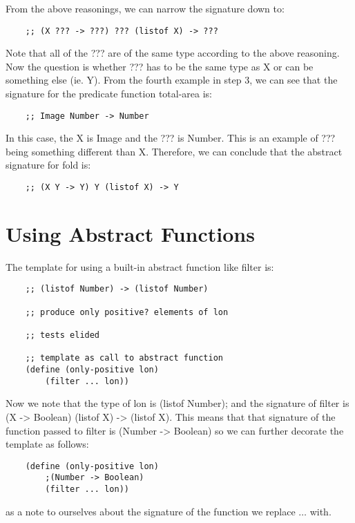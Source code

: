 \documentclass[11pt,a4paper]{report}
\begin{document}
	From the above reasonings, we can narrow the signature down to:
	\begin{verbatim}
	;; (X ??? -> ???) ??? (listof X) -> ???
	\end{verbatim}
	
	Note that all of the ??? are of the same type according to the above reasoning. Now the question
	is whether ??? has to be the same type as X or can be something else (ie. Y).
	From the fourth example in step 3, we can see that the signature for the predicate function
	total-area is:
	
	\begin{verbatim}
	;; Image Number -> Number
	\end{verbatim}
	
	In this case, the X is Image and the ??? is Number. This is an example of ??? being something
	different than X. Therefore, we can conclude that the abstract signature for fold is:
	
	\begin{verbatim}
	;; (X Y -> Y) Y (listof X) -> Y
	\end{verbatim}
	
	\section{Using Abstract Functions} \label{sec:using_abs_func}
	The template for using a built-in abstract function like filter is:
	\begin{verbatim}
	;; (listof Number) -> (listof Number)
	
	;; produce only positive? elements of lon
	
	;; tests elided
	
	;; template as call to abstract function
	(define (only-positive lon)
		(filter ... lon))
	\end{verbatim}
	
	Now we note that the type of lon is (listof Number); and the signature of filter is (X -> Boolean)
	(listof X) -> (listof X). This means that that signature of the function passed to filter is
	(Number -> Boolean) so we can further decorate the template as follows:
	
	\begin{verbatim}
	(define (only-positive lon)
		;(Number -> Boolean)
		(filter ... lon))
	\end{verbatim}
	
	as a note to ourselves about the signature of the function we replace $\ldots$ with.
\end{document}
